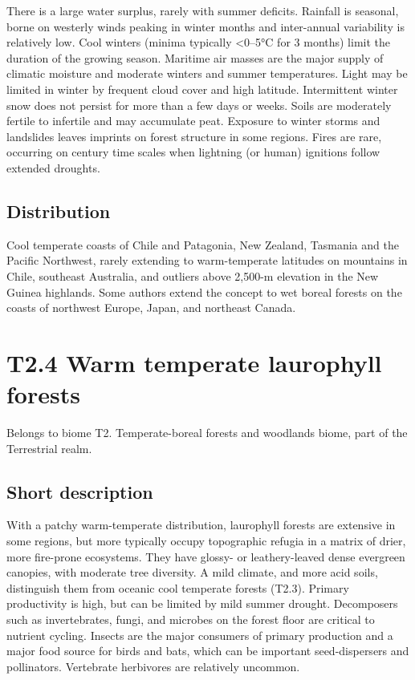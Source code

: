 \documentclass[
  letterpaper,
  DIV=11,
  numbers=noendperiod]{scrartcl}
\begin{document}
There is a large water surplus, rarely with summer deficits. Rainfall is
seasonal, borne on westerly winds peaking in winter months and
inter-annual variability is relatively low. Cool winters (minima
typically \textless0--5°C for 3 months) limit the duration of the
growing season. Maritime air masses are the major supply of climatic
moisture and moderate winters and summer temperatures. Light may be
limited in winter by frequent cloud cover and high latitude.
Intermittent winter snow does not persist for more than a few days or
weeks. Soils are moderately fertile to infertile and may accumulate
peat. Exposure to winter storms and landslides leaves imprints on forest
structure in some regions. Fires are rare, occurring on century time
scales when lightning (or human) ignitions follow extended droughts.

\subsection{Distribution}\label{distribution-75}

Cool temperate coasts of Chile and Patagonia, New Zealand, Tasmania and
the Pacific Northwest, rarely extending to warm-temperate latitudes on
mountains in Chile, southeast Australia, and outliers above 2,500-m
elevation in the New Guinea highlands. Some authors extend the concept
to wet boreal forests on the coasts of northwest Europe, Japan, and
northeast Canada.

\section{T2.4 Warm temperate laurophyll
forests}\label{t2.4-warm-temperate-laurophyll-forests}

Belongs to biome T2. Temperate-boreal forests and woodlands biome, part
of the Terrestrial realm.

\subsection{Short description}\label{short-description-76}

With a patchy warm-temperate distribution, laurophyll forests are
extensive in some regions, but more typically occupy topographic refugia
in a matrix of drier, more fire-prone ecosystems. They have glossy- or
leathery-leaved dense evergreen canopies, with moderate tree diversity.
A mild climate, and more acid soils, distinguish them from oceanic cool
temperate forests (T2.3). Primary productivity is high, but can be
limited by mild summer drought. Decomposers such as invertebrates,
fungi, and microbes on the forest floor are critical to nutrient
cycling. Insects are the major consumers of primary production and a
major food source for birds and bats, which can be important
seed-dispersers and pollinators. Vertebrate herbivores are relatively
uncommon.
\end{document}

